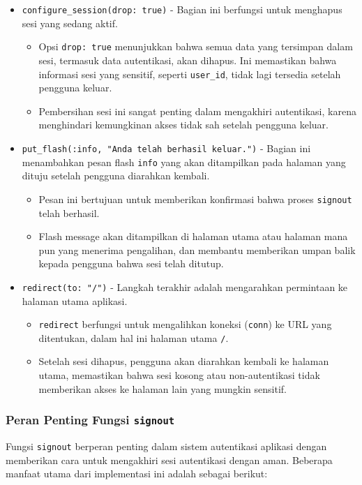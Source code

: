 \begin{itemize}
	\item \texttt{configure\_session(drop: true)} - Bagian ini berfungsi untuk menghapus sesi yang sedang aktif. 
	\begin{itemize}
		\item Opsi \texttt{drop: true} menunjukkan bahwa semua data yang tersimpan dalam sesi, termasuk data autentikasi, akan dihapus. Ini memastikan bahwa informasi sesi yang sensitif, seperti \texttt{user\_id}, tidak lagi tersedia setelah pengguna keluar.
		\item Pembersihan sesi ini sangat penting dalam mengakhiri autentikasi, karena menghindari kemungkinan akses tidak sah setelah pengguna keluar.
	\end{itemize}
	
	\item \texttt{put\_flash(:info, "Anda telah berhasil keluar.")} - Bagian ini menambahkan pesan flash \texttt{info} yang akan ditampilkan pada halaman yang dituju setelah pengguna diarahkan kembali.
	\begin{itemize}
		\item Pesan ini bertujuan untuk memberikan konfirmasi bahwa proses \texttt{signout} telah berhasil. 
		\item Flash message akan ditampilkan di halaman utama atau halaman mana pun yang menerima pengalihan, dan membantu memberikan umpan balik kepada pengguna bahwa sesi telah ditutup.
	\end{itemize}
	
	\item \texttt{redirect(to: "/")} - Langkah terakhir adalah mengarahkan permintaan ke halaman utama aplikasi.
	\begin{itemize}
		\item \texttt{redirect} berfungsi untuk mengalihkan koneksi (\texttt{conn}) ke URL yang ditentukan, dalam hal ini halaman utama \texttt{/}.
		\item Setelah sesi dihapus, pengguna akan diarahkan kembali ke halaman utama, memastikan bahwa sesi kosong atau non-autentikasi tidak memberikan akses ke halaman lain yang mungkin sensitif.
	\end{itemize}
\end{itemize}

\subsubsection{Peran Penting Fungsi \texttt{signout}}
Fungsi \texttt{signout} berperan penting dalam sistem autentikasi aplikasi dengan memberikan cara untuk mengakhiri sesi autentikasi dengan aman. Beberapa manfaat utama dari implementasi ini adalah sebagai berikut:

